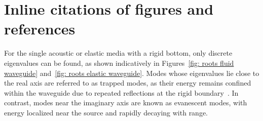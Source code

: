 \section{Inline citations of figures and references}
For the single acoustic or elastic media with a rigid bottom, only discrete eigenvalues can be found, as shown indicatively in Figures~\ref{fig: roots fluid waveguide} and~\ref{fig: roots elastic waveguide}. Modes whose eigenvalues lie close to the real axis are referred to as trapped modes, as their energy remains confined within the waveguide due to repeated reflections at the rigid boundary~\cite{tsouvalas2014completeness}. In contrast, modes near the imaginary axis are known as evanescent modes, with energy localized near the source and rapidly decaying with range. 